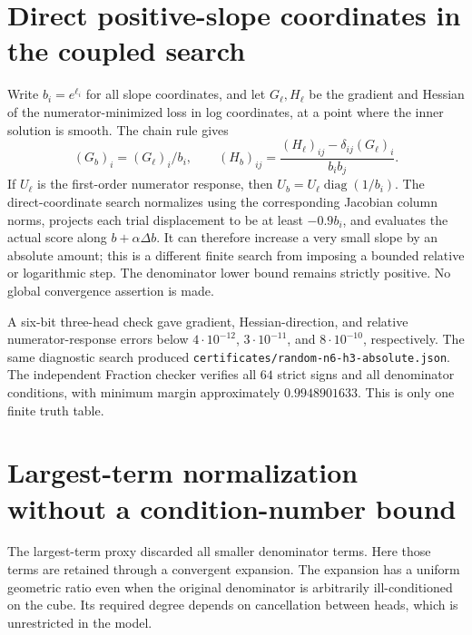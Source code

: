 \documentclass[11pt]{article}
\begin{document}
\section{Direct positive-slope coordinates in the coupled search}

Write $b_i=e^{\ell_i}$ for all slope coordinates, and let $G_\ell,H_\ell$
be the gradient and Hessian of the numerator-minimized loss in log
coordinates, at a point where the inner solution is smooth. The chain
rule gives
\[
 (G_b)_i=(G_\ell)_i/b_i,\qquad
 (H_b)_{ij}=\frac{(H_\ell)_{ij}-\delta_{ij}(G_\ell)_i}{b_i b_j}.
\]
If $U_\ell$ is the first-order numerator response, then
$U_b=U_\ell\operatorname{diag}(1/b_i)$.
The direct-coordinate search normalizes using the corresponding
Jacobian column norms, projects each trial displacement to be at least
$-0.9b_i$, and evaluates the actual score along $b+\alpha\Delta b$.
It can therefore increase a very small slope by an absolute amount;
this is a different finite search from imposing a bounded relative
or logarithmic step. The denominator lower bound remains strictly
positive. No global convergence assertion is made.

A six-bit three-head check gave gradient, Hessian-direction, and
relative numerator-response errors below $4\cdot10^{-12}$,
$3\cdot10^{-11}$, and $8\cdot10^{-10}$, respectively.
The same diagnostic search produced
\texttt{certificates/random-n6-h3-absolute.json}.
The independent Fraction checker verifies all $64$ strict signs and
all denominator conditions, with minimum margin approximately
$0.9948901633$. This is only one finite truth table.


\section{Largest-term normalization without a condition-number bound}

The largest-term proxy discarded all smaller denominator terms. Here
those terms are retained through a convergent expansion. The expansion
has a uniform geometric ratio even when the original denominator is
arbitrarily ill-conditioned on the cube. Its required degree depends
on cancellation between heads, which is unrestricted in the model.
\end{document}
